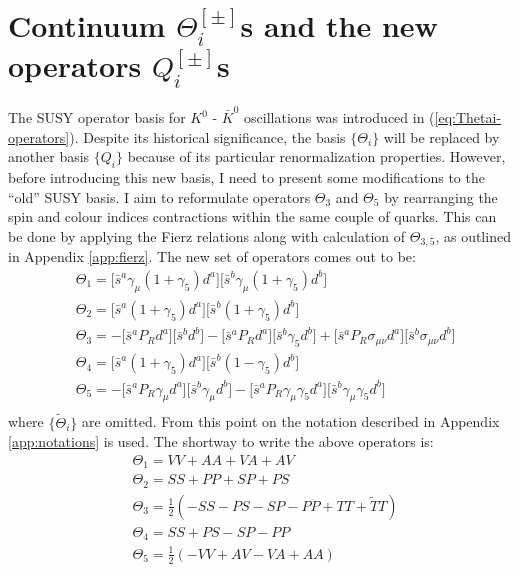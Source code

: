 \documentclass[english, LaM, oneside, noexaminfo]{sapthesis}
\newcommand{\kkb}{$K^0$ - $\bar K^0$ }
\begin{document}
\section{Continuum $\Theta_i^{[\pm]}$s and the new operators $Q_i^{[\pm]}$s}
\noindent
The SUSY operator basis for \kkb oscillations was introduced in (\ref{eq:Thetai-operators}).
Despite its historical significance, the basis $\{\Theta_i\}$ will be replaced by another basis $\{Q_i\}$ because of its particular renormalization properties.
However, before introducing this new basis, I need to present some modifications to the ``old'' SUSY basis.
\newline
I aim to reformulate operators $\Theta_3$ and $\Theta_5$ by rearranging the spin and colour indices contractions within the same couple of quarks. 
This can be done by applying the Fierz relations \cite{Itzykson-Zuber} along with calculation of $\Theta_{3,5}$, as outlined in Appendix \ref{app:fierz}.
The new set of operators comes out to be:
\begin{equation*}
    \begin{aligned}
        & \Theta_1 = \Big[\bar s^a \gamma_\mu (1+\gamma_5) d^a \Big]\Big[ \bar s^b \gamma_\mu (1+\gamma_5) d^b \Big] \\
        & \Theta_2 = \Big[\bar s^a  (1+\gamma_5) d^a \Big]\Big[ \bar s^b (1+\gamma_5) d^b \Big] \\
        & \Theta_3 = -\Big[\bar s^a  P_R d^a \Big]\Big[ \bar s^b d^b \Big] - \Big[\bar s^a P_R d^a \Big]\Big[ \bar s^b \gamma_5 d^b \Big] + \Big[\bar s^a P_R \sigma_{\mu\nu} d^a \Big]\Big[ \bar s^b \sigma_{\mu\nu} d^b \Big] \\ 
        & \Theta_4 = \Big[\bar s^a  (1+\gamma_5) d^a \Big]\Big[ \bar s^b (1-\gamma_5) d^b \Big] \\
        & \Theta_5 = -\Big[\bar s^a  P_R\gamma_\mu d^a \Big]\Big[ \bar s^b \gamma_\mu d^b \Big] - \Big[\bar s^a P_R \gamma_\mu \gamma_5 d^a \Big]\Big[ \bar s^b \gamma_\mu\gamma_5 d^b \Big] \\
     \end{aligned}
\end{equation*}
where $\{\tilde\Theta_i\}$ are omitted.
From this point on the notation described in Appendix \ref{app:notations} is used.
The shortway to write the above operators is:
\begin{equation*}
    \begin{aligned}
        & \Theta_1 = VV + AA +VA +AV \\
        & \Theta_2 = SS + PP + SP + PS \\
        & \Theta_3 = \frac{1}{2}\left( -SS-PS-SP-PP+TT+\tilde{T}T \right) \\
        & \Theta_4 = SS + PS - SP - PP \\
        & \Theta_5 = \frac{1}{2}\left(-VV+AV-VA+AA\right) \\
     \end{aligned}
\end{equation*}
\end{document}
